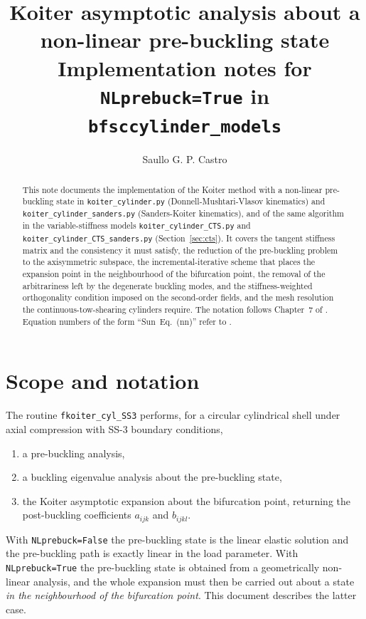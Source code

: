 \documentclass[11pt,a4paper]{article}
\title{Koiter asymptotic analysis about a non-linear pre-buckling state\\
\large Implementation notes for \texttt{NLprebuck=True} in
\texttt{bfsccylinder\_models}}
\author{Saullo G. P. Castro}
\date{}
\begin{document}
\maketitle

\begin{abstract}
This note documents the implementation of the Koiter method with a
non-linear pre-buckling state in \texttt{koiter\_cylinder.py}
(Donnell-Mushtari-Vlasov kinematics) and \texttt{koiter\_cylinder\_sanders.py}
(Sanders-Koiter kinematics), and of the same algorithm in the
variable-stiffness models \texttt{koiter\_cylinder\_CTS.py} and
\texttt{koiter\_cylinder\_CTS\_sanders.py} (Section~\ref{sec:cts}).
It covers the tangent stiffness matrix and the
consistency it must satisfy, the reduction of the pre-buckling problem to the
axisymmetric subspace, the incremental-iterative scheme that places the
expansion point in the neighbourhood of the bifurcation point, the removal of
the arbitrariness left by the degenerate buckling modes, and the
stiffness-weighted orthogonality condition imposed on the second-order
fields, and the mesh resolution the continuous-tow-shearing cylinders
require.
The notation follows Chapter~7 of \citet{degenhardt2017}.  Equation
numbers of the form ``Sun~Eq.~(nn)'' refer to \citet{sun2020}.
\end{abstract}

\tableofcontents

\section{Scope and notation}

The routine \texttt{fkoiter\_cyl\_SS3} performs, for a circular cylindrical
shell under axial compression with SS-3 boundary conditions,
\begin{enumerate}\itemsep2pt
  \item a pre-buckling analysis,
  \item a buckling eigenvalue analysis about the pre-buckling state,
  \item the Koiter asymptotic expansion about the bifurcation point, returning
        the post-buckling coefficients $a_{ijk}$ and $b_{ijkl}$.
\end{enumerate}

With \texttt{NLprebuck=False} the pre-buckling state is the linear elastic
solution and the pre-buckling path is exactly linear in the load parameter.
With \texttt{NLprebuck=True} the pre-buckling state is obtained from a
geometrically non-linear analysis, and the whole expansion must then be
carried out about a state \emph{in the neighbourhood of the bifurcation
point}.  This document describes the latter case.
\end{document}
